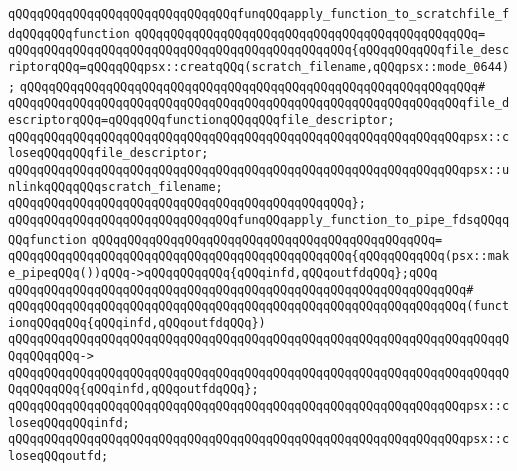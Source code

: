 \verb|qQQqqQQqqQQqqQQqqQQqqQQqqQQqqQQqfunqQQqapply_function_to_scratchfile_fdqQQqqQQqfunction|\newline
\verb|qQQqqQQqqQQqqQQqqQQqqQQqqQQqqQQqqQQqqQQqqQQqqQQq=|\newline
\verb|qQQqqQQqqQQqqQQqqQQqqQQqqQQqqQQqqQQqqQQqqQQqqQQq{qQQqqQQqqQQqfile_descriptorqQQq=qQQqqQQqpsx::creatqQQq(scratch_filename,qQQqpsx::mode_0644);|\newline
\verb|qQQqqQQqqQQqqQQqqQQqqQQqqQQqqQQqqQQqqQQqqQQqqQQqqQQqqQQqqQQqqQQq#|\newline
\verb|qQQqqQQqqQQqqQQqqQQqqQQqqQQqqQQqqQQqqQQqqQQqqQQqqQQqqQQqqQQqqQQqfile_descriptorqQQq=qQQqqQQqfunctionqQQqqQQqfile_descriptor;|\newline
\newline
\verb|qQQqqQQqqQQqqQQqqQQqqQQqqQQqqQQqqQQqqQQqqQQqqQQqqQQqqQQqqQQqqQQqpsx::closeqQQqqQQqfile_descriptor;|\newline
\newline
\verb|qQQqqQQqqQQqqQQqqQQqqQQqqQQqqQQqqQQqqQQqqQQqqQQqqQQqqQQqqQQqqQQqpsx::unlinkqQQqqQQqscratch_filename;|\newline
\verb|qQQqqQQqqQQqqQQqqQQqqQQqqQQqqQQqqQQqqQQqqQQqqQQq};|\newline
\newline
\verb|qQQqqQQqqQQqqQQqqQQqqQQqqQQqqQQqfunqQQqapply_function_to_pipe_fdsqQQqqQQqfunction|\newline
\verb|qQQqqQQqqQQqqQQqqQQqqQQqqQQqqQQqqQQqqQQqqQQqqQQq=|\newline
\verb|qQQqqQQqqQQqqQQqqQQqqQQqqQQqqQQqqQQqqQQqqQQqqQQq{qQQqqQQqqQQq(psx::make_pipeqQQq())qQQq->qQQqqQQqqQQq{qQQqinfd,qQQqoutfdqQQq};qQQq|\newline
\verb|qQQqqQQqqQQqqQQqqQQqqQQqqQQqqQQqqQQqqQQqqQQqqQQqqQQqqQQqqQQqqQQq#|\newline
\verb|qQQqqQQqqQQqqQQqqQQqqQQqqQQqqQQqqQQqqQQqqQQqqQQqqQQqqQQqqQQqqQQq(functionqQQqqQQq{qQQqinfd,qQQqoutfdqQQq})|\newline
\verb|qQQqqQQqqQQqqQQqqQQqqQQqqQQqqQQqqQQqqQQqqQQqqQQqqQQqqQQqqQQqqQQqqQQqqQQqqQQqqQQq->|\newline
\verb|qQQqqQQqqQQqqQQqqQQqqQQqqQQqqQQqqQQqqQQqqQQqqQQqqQQqqQQqqQQqqQQqqQQqqQQqqQQqqQQq{qQQqinfd,qQQqoutfdqQQq};|\newline
\newline
\verb|qQQqqQQqqQQqqQQqqQQqqQQqqQQqqQQqqQQqqQQqqQQqqQQqqQQqqQQqqQQqqQQqpsx::closeqQQqqQQqinfd;|\newline
\verb|qQQqqQQqqQQqqQQqqQQqqQQqqQQqqQQqqQQqqQQqqQQqqQQqqQQqqQQqqQQqqQQqpsx::closeqQQqoutfd;|\newline
